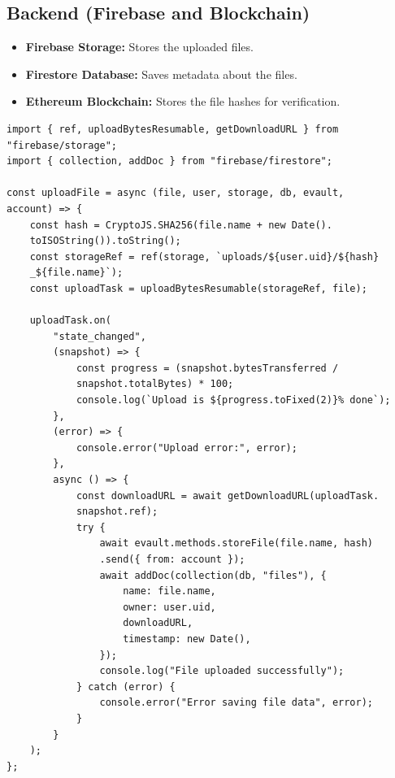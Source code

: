 \documentclass[12pt,a4paper]{report}
\begin{document}
\subsection{Backend (Firebase and Blockchain)}
\begin{itemize}
   \item \textbf{Firebase Storage:} Stores the uploaded files.
   \item \textbf{Firestore Database:} Saves metadata about the files.
   \item \textbf{Ethereum Blockchain:} Stores the file hashes for verification.
\end{itemize}
\begin{lstlisting}[caption=Backend Code Snippet]
import { ref, uploadBytesResumable, getDownloadURL } from 
"firebase/storage";
import { collection, addDoc } from "firebase/firestore";

const uploadFile = async (file, user, storage, db, evault, 
account) => {
    const hash = CryptoJS.SHA256(file.name + new Date().
    toISOString()).toString();
    const storageRef = ref(storage, `uploads/${user.uid}/${hash}
    _${file.name}`);
    const uploadTask = uploadBytesResumable(storageRef, file);

    uploadTask.on(
        "state_changed",
        (snapshot) => {
            const progress = (snapshot.bytesTransferred / 
            snapshot.totalBytes) * 100;
            console.log(`Upload is ${progress.toFixed(2)}% done`);
        },
        (error) => {
            console.error("Upload error:", error);
        },
        async () => {
            const downloadURL = await getDownloadURL(uploadTask.
            snapshot.ref);
            try {
                await evault.methods.storeFile(file.name, hash)
                .send({ from: account });
                await addDoc(collection(db, "files"), {
                    name: file.name,
                    owner: user.uid,
                    downloadURL,
                    timestamp: new Date(),
                });
                console.log("File uploaded successfully");
            } catch (error) {
                console.error("Error saving file data", error);
            }
        }
    );
};

   \end{lstlisting}
\end{document}
